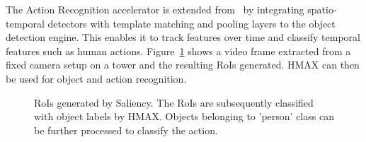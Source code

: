 The Action Recognition accelerator is extended from~\cite{action-recognition} by integrating spatio-temporal detectors with template matching and pooling layers to the object detection engine. This enables it to track features over time and classify temporal features such as human actions. Figure~\ref{fig:RoIs_campus_000042} shows a video frame extracted from a fixed camera setup on a tower and the resulting RoIs generated. HMAX can then be used for object and action recognition.

\begin{figure}[ht!]
\centering
{}
\caption{\label{fig:RoIs_campus_000042} RoIs generated by Saliency. The RoIs are subsequently classified with object labels by HMAX. Objects belonging to 'person' class can be further processed to classify the action.}
\end{figure}

